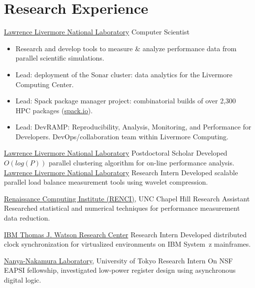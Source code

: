 \section{Research Experience}
		{\href{http://www.llnl.gov}{Lawrence Livermore National Laboratory}}
		{Computer Scientist}
		{}{}
		{
		\begin{itemize}
		\item Research and develop tools to measure \& analyze
		 performance data from parallel scientific simulations.
		\item Lead: deployment of the Sonar cluster: data analytics for the Livermore Computing Center.
		\item Lead: Spack package manager project: combinatorial builds of over 2,300 HPC packages (\href{https://spack.io}{spack.io}).
		\item Lead: DevRAMP: Reproducibility, Analysis, Monitoring, and Performance for Developers.\newline
          DevOps/collaboration team within Livermore Computing.
		\end{itemize}
	}
		{\href{http://www.llnl.gov}{Lawrence Livermore National Laboratory}}
		{Postdoctoral Scholar}
		{}{}
		{Developed $O(log(P))$ parallel clustering algorithm for on-line performance analysis.
		 }
		{\href{http://www.llnl.gov}{Lawrence Livermore National Laboratory}}
		{Research Intern}
		{}{}
		{Developed scalable parallel load balance measurement tools using wavelet compression.}

		{\href{http://www.renci.org}{Renaissance Computing Institute (RENCI)}, UNC Chapel Hill}
		{Research Assistant}
		{}{}
		{Researched statistical and numerical techniques for performance measurement data reduction.}

		{\href{http://www.watson.ibm.com}{IBM Thomas J. Watson Research Center}}
		{Research Intern}
		{}{}
		{Developed distributed clock synchronization for virtualized environments on IBM System~z mainframes.}

		{\href{http://www.hal.rcast.u-tokyo.ac.jp/}{Nanya-Nakamura Laboratory}, University of Tokyo}
		{Research Intern}
		{}{}
		{On NSF EAPSI fellowship, investigated low-power register design using asynchronous digital logic.}


